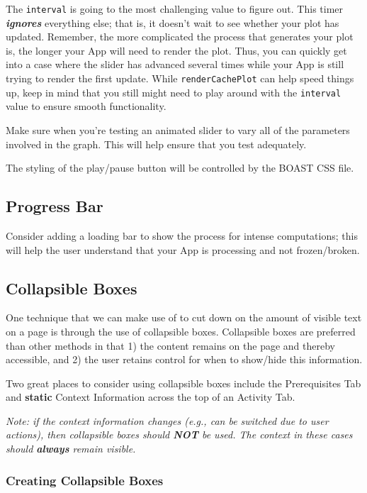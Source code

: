 \documentclass[
]{book}
\begin{document}
The \texttt{interval} is going to the most challenging value to figure out. This timer \emph{\textbf{ignores}} everything else; that is, it doesn't wait to see whether your plot has updated. Remember, the more complicated the process that generates your plot is, the longer your App will need to render the plot. Thus, you can quickly get into a case where the slider has advanced several times while your App is still trying to render the first update. While \texttt{renderCachePlot} can help speed things up, keep in mind that you still might need to play around with the \texttt{interval} value to ensure smooth functionality.

Make sure when you're testing an animated slider to vary all of the parameters involved in the graph. This will help ensure that you test adequately.

The styling of the play/pause button will be controlled by the BOAST CSS file.

\hypertarget{progress-bar}{%
\subsection{Progress Bar}\label{progress-bar}}

Consider adding a loading bar to show the process for intense computations; this will help the user understand that your App is processing and not frozen/broken.

\hypertarget{collapsible}{%
\subsection{Collapsible Boxes}\label{collapsible}}

One technique that we can make use of to cut down on the amount of visible text on a page is through the use of collapsible boxes. Collapsible boxes are preferred than other methods in that 1) the content remains on the page and thereby accessible, and 2) the user retains control for when to show/hide this information.

Two great places to consider using collapsible boxes include the Prerequisites Tab and \textbf{static} Context Information across the top of an Activity Tab.

\emph{Note: if the context information changes (e.g., can be switched due to user actions), then collapsible boxes should \textbf{NOT} be used. The context in these cases should \textbf{always} remain visible.}

\hypertarget{creating-collapsible-boxes}{%
\subsubsection{Creating Collapsible Boxes}\label{creating-collapsible-boxes}}
\end{document}
